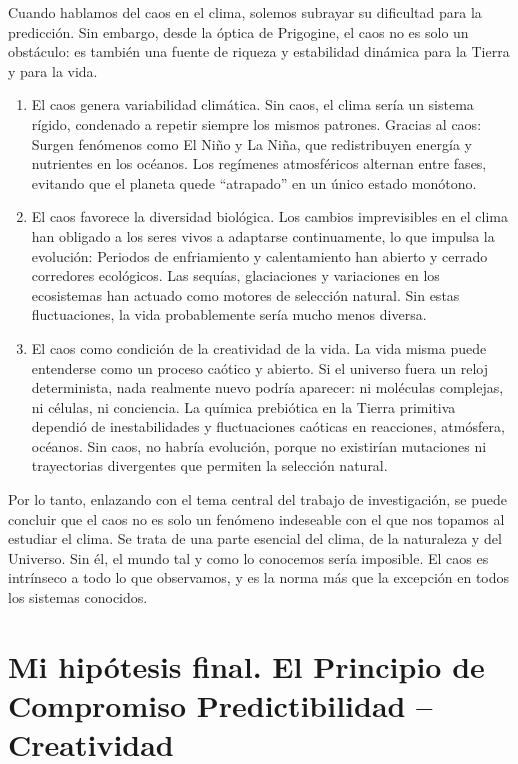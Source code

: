 \documentclass[
  10pt,
  a4paper,
  DIV=11,
  numbers=noendperiod,
  open=any]{scrreprt}
\numberwithin{equation}{chapter}
\numberwithin{equation}{section}
\renewcommand{\[}{\begin{equation}}
\renewcommand{\]}{\end{equation}}
\begin{document}
Cuando hablamos del caos en el clima, solemos subrayar su dificultad
para la predicción. Sin embargo, desde la óptica de Prigogine, el caos
no es solo un obstáculo: es también una fuente de riqueza y estabilidad
dinámica para la Tierra y para la vida.

\begin{enumerate}
\def\labelenumi{\arabic{enumi}.}
\item
  El caos genera variabilidad climática. Sin caos, el clima sería un
  sistema rígido, condenado a repetir siempre los mismos patrones.
  Gracias al caos: Surgen fenómenos como El Niño y La Niña, que
  redistribuyen energía y nutrientes en los océanos. Los regímenes
  atmosféricos alternan entre fases, evitando que el planeta quede
  ``atrapado'' en un único estado monótono.
\item
  El caos favorece la diversidad biológica. Los cambios imprevisibles en
  el clima han obligado a los seres vivos a adaptarse continuamente, lo
  que impulsa la evolución: Periodos de enfriamiento y calentamiento han
  abierto y cerrado corredores ecológicos. Las sequías, glaciaciones y
  variaciones en los ecosistemas han actuado como motores de selección
  natural. Sin estas fluctuaciones, la vida probablemente sería mucho
  menos diversa.
\item
  El caos como condición de la creatividad de la vida. La vida misma
  puede entenderse como un proceso caótico y abierto. Si el universo
  fuera un reloj determinista, nada realmente nuevo podría aparecer: ni
  moléculas complejas, ni células, ni conciencia. La química prebiótica
  en la Tierra primitiva dependió de inestabilidades y fluctuaciones
  caóticas en reacciones, atmósfera, océanos. Sin caos, no habría
  evolución, porque no existirían mutaciones ni trayectorias divergentes
  que permiten la selección natural.
\end{enumerate}

Por lo tanto, enlazando con el tema central del trabajo de
investigación, se puede concluir que el caos no es solo un fenómeno
indeseable con el que nos topamos al estudiar el clima. Se trata de una
parte esencial del clima, de la naturaleza y del Universo. Sin él, el
mundo tal y como lo conocemos sería imposible. El caos es intrínseco a
todo lo que observamos, y es la norma más que la excepción en todos los
sistemas conocidos.

\chapter{Mi hipótesis final. El Principio de Compromiso Predictibilidad
--
Creatividad}\label{pcpc}
\end{document}
